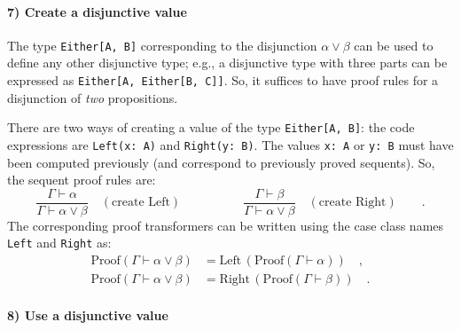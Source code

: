 \paragraph{7) Create a disjunctive value}

The type \lstinline!Either[A, B]! corresponding to the disjunction
$\alpha\vee\beta$ can be used to define any other disjunctive type;
e.g., a disjunctive type with three parts can be expressed as \lstinline!Either[A, Either[B, C]]!.
So, it suffices to have proof rules for a disjunction of \emph{two}
propositions.

There are two ways of creating a value of the type \lstinline!Either[A, B]!:
the code expressions are \lstinline!Left(x: A)! and \lstinline!Right(y: B)!.
The values \lstinline!x: A! or \lstinline!y: B! must have been computed
previously (and correspond to previously proved sequents). So, the
sequent proof rules are:
\[
\frac{\Gamma\vdash\alpha}{\Gamma\vdash\alpha\vee\beta}\quad(\text{create Left})\quad\quad\quad\quad\quad\frac{\Gamma\vdash\beta}{\Gamma\vdash\alpha\vee\beta}\quad(\text{create Right})\quad\quad.
\]
The corresponding proof transformers can be written using the case
class names \lstinline!Left! and \lstinline!Right! as:
\begin{align*}
\text{Proof}\left(\Gamma\vdash\alpha\vee\beta\right) & =\text{Left}\,(\text{Proof}\left(\Gamma\vdash\alpha\right))\quad,\\
\text{Proof}\left(\Gamma\vdash\alpha\vee\beta\right) & =\text{Right}\,(\text{Proof}\left(\Gamma\vdash\beta\right))\quad.
\end{align*}


\paragraph{8) Use a disjunctive value}

